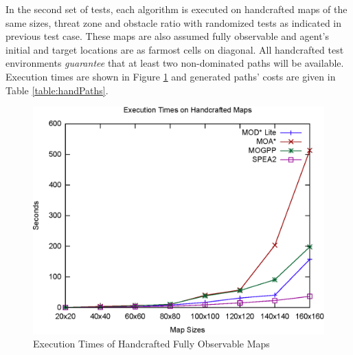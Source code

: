 \documentclass[10pt,journal]{IEEEtran}
\begin{document}
In the second set of tests, each algorithm is executed on handcrafted maps of the same sizes, threat zone and obstacle ratio with randomized tests as indicated in previous test case. These maps are also assumed fully observable and agent's initial and target locations are as farmost cells on diagonal. All handcrafted test environments \textit{guarantee} that at least two non-dominated paths will be available. Execution times are shown in Figure \ref{fig:hand_fully} and generated paths' costs are given in Table \ref{table:handPaths}.

\begin{figure}
\centering
\includegraphics[scale=0.45]{experimental/handcrafted}
\caption{Execution Times of Handcrafted Fully Observable Maps}
\label{fig:hand_fully}
\end{figure}
\end{document}
